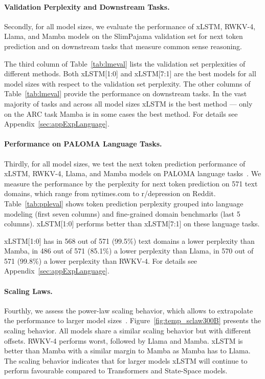 \paragraph{Validation Perplexity and Downstream Tasks.}
\label{sec:spaj_downstream_eval}
Secondly, for all model sizes, we evaluate the performance of xLSTM, RWKV-4, Llama, and Mamba models on the SlimPajama validation set for next token prediction and on downstream tasks that measure common sense reasoning.

The third column of 
Table~\ref{tab:lmeval} lists the validation set perplexities of different methods. Both xLSTM[1:0] and xLSTM[7:1] are the best models for all model sizes with respect to the validation set perplexity. The other columns of 
Table~\ref{tab:lmeval} provide the performance on downstream tasks. In the vast majority of tasks and across all model sizes xLSTM is the best method --- only on the ARC task Mamba is in some cases the best method. For details see Appendix~\ref{sec:appExpLanguage}. 

\paragraph{Performance on PALOMA Language Tasks.} Thirdly, for all model sizes, we test the next token prediction performance of xLSTM, RWKV-4, Llama, and Mamba models on PALOMA language tasks~\citep{Magnusson:23arxivshort}. We measure the performance by the perplexity for next token prediction on 571 text domains, which range from nytimes.com to r/depression on Reddit.
Table~\ref{tab:ppleval} shows token prediction perplexity grouped into language modeling (first seven columns) and fine-grained domain benchmarks (last 5 columns). xLSTM[1:0] performs better than xLSTM[7:1] on these language tasks.

xLSTM[1:0] has in 568 out of 571 (99.5\%) text domains a lower perplexity than Mamba, in 486 out of 571 (85.1\%) a lower perplexity than Llama, in 570 out of 571 (99.8\%) a lower perplexity than RWKV-4. For details see Appendix~\ref{sec:appExpLanguage}. 

\paragraph{Scaling Laws.} Fourthly, we assess the power-law scaling behavior, which allows to extrapolate the performance to larger model sizes~\citep{Kaplan:20,Brown:20short}.
Figure~\ref{fig:temp_sclaw300B} presents the scaling behavior. All models share a similar scaling behavior but with different offsets. RWKV-4 performs worst, followed by Llama and Mamba. xLSTM is better than Mamba with a similar margin to Mamba as Mamba has to Llama. The scaling behavior indicates that for larger models xLSTM will continue to perform favourable compared to Transformers and State-Space models.

